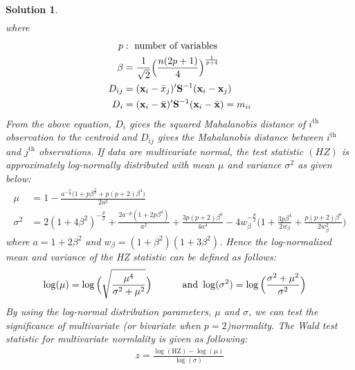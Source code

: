 \documentclass[11pt]{article}
\newtheorem{sol}{Solution}
\begin{document}
\begin{sol}
\begin{align*}
	\end{align*}
	where 
	\begin{align*}
		p&: \text{ number of variables}\\
		\beta &= \frac{1}{\sqrt{2}}\Big(\frac{n(2p+1)}{4}\Big)^{\frac{1}{p+4}}\\
		D_{ij} &= ({\bf x}_i - \bar{x}_j)'{\bf S}^{-1}({\bf x}_i - {\bf x}_j)\\
		D_i &= ({\bf x}_i - \bar{{\bf x}})'{\bf S}^{-1}({\bf x}_i - \bar{{\bf x}}) = m_{ii}
	\end{align*}
	From the above equation, $D_i$ gives the squared Mahalanobis distance of $i^{\text{th}}$ observation to the centroid and $D_{ij}$ gives the Mahalanobis distance between $i^{\text{th}}$ and $j^{\text{th}}$ observations. If data are multivariate normal, the test statistic $(HZ)$ is approximately log-normally distributed with mean $\mu$ and variance $\sigma^2$ as given below:
	\begin{align*}
		\mu &= 1 - \frac{a^{-\frac{p}{2}}\Big(1 + p\beta^{\frac{2}{a}} + p(p+2)\beta^4\Big)}{2a^2}\\
		\sigma^2 &= 2(1 + 4\beta^2)^{-\frac{p}{2}} + \frac{2a^{-p}(1 + 2p\beta^4)}{a^2} + \frac{3p(p + 2)\beta^8}{4a^4} - 4w_{\beta}^{-\frac{p}{2}}\Big(1 + \frac{3p\beta^4}{2w_{\beta}}+ \frac{p(p + 2)\beta^8}{2w_{\beta}^2}\Big)
	\end{align*}
	where $a = 1 + 2\beta^2$ and $w_{\beta} = (1 + \beta^2)(1+ 3\beta^2)$. Hence the log-normalized mean and variance of the HZ statistic can be defined as follows:
	\begin{align*}
		\log(\mu) &= \log\Big(\sqrt{\frac{\mu^4}{\sigma^2 + \mu^2}}\Big)
		\hskip 1cm \text{ and } \log(\sigma^2) = \log\Big(\frac{\sigma^2 + \mu^2}{\sigma^2}\Big)
	\end{align*}
	By using the log-normal distribution parameters, $\mu$ and $\sigma$, we can test the significance of multivariate (or bivariate when $p = 2$)normality. The Wald test statistic for multivariate normlality is given as following:
	\begin{align*}
		z = \frac{\log(\text{HZ}) - \log(\mu)}{\log(\sigma)}
	\end{align*}
\end{sol}
\end{document}
